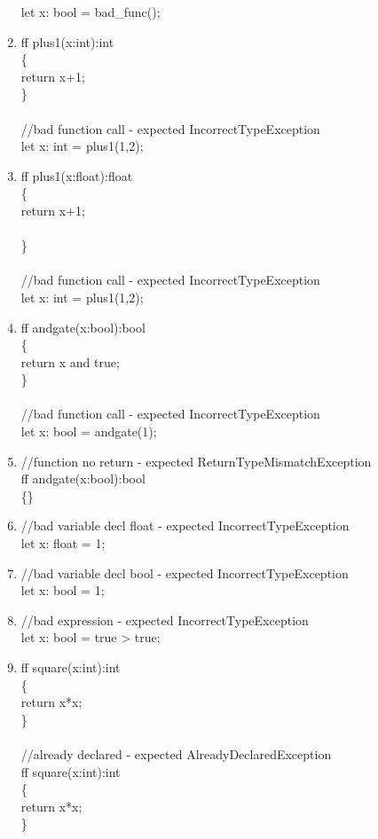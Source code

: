 \documentclass{article}
\newcommand\tab[1][1cm]{\hspace*{#1}}
\begin{document}
\begin{enumerate}
let x: bool = bad\_func();
			\item
			ff plus1(x:int):int\\
 \{\\
    \tab return x+1;\\
\}\\
\\
//bad function call - expected IncorrectTypeException\\
let x: int =  plus1(1,2);
			\item
			ff plus1(x:float):float\\
 \{\\
    \tab return x+1;\\
\\\}\\\\

//bad function call - expected IncorrectTypeException\\
let x: int =  plus1(1,2);
			\item
			ff andgate(x:bool):bool\\
\{\\
    \tab return x and true;\\
\}\\\\

//bad function call - expected IncorrectTypeException\\
let x: bool =  andgate(1);
			\item
//function no return - expected ReturnTypeMismatchException\\
ff andgate(x:bool):bool\\
\{\}

			\item
//bad variable decl float - expected IncorrectTypeException\\
let x: float = 1;
			\item
//bad variable decl bool - expected IncorrectTypeException\\
let x: bool = 1;
			\item
//bad expression - expected IncorrectTypeException\\
let x: bool = true > true;
	\item
	ff square(x:int):int\\
\{\\
\tab return x*x;\\
\}\\\\
//already declared - expected AlreadyDeclaredException\\
ff square(x:int):int\\
\{\\
\tab return x*x;\\
\}\\



			\end{enumerate}
			
\end{document}
